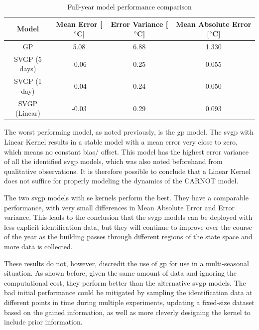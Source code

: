 \begin{table}[ht]
\centering
    \begin{tabular}{||c c c c||}
        \hline
        Model & Mean Error [$\degree$C] & Error Variance [$\degree$C] & Mean
        Absolute Error [$\degree$C]\\
        \hline \hline
        GP & 5.08 & 6.88 & 1.330 \\ 
        SVGP (5 days) & -0.06 & 0.25 & 0.055 \\ 
        SVGP (1 day) & -0.04 & 0.24 & 0.050 \\ 
        SVGP (Linear)& -0.03 & 0.29 & 0.093 \\ 
        \hline
    \end{tabular}
\caption{Full-year model performance comparison}
\label{tab:Model_comparations}
\end{table}

The worst performing model, as noted previously, is the \acrshort{gp} model. The
\acrshort{svgp} with Linear Kernel results in a stable model with a mean error
very close to zero, which means no constant bias/ offset. This model has the
highest error variance of all the identified \acrshort{svgp} models, which was
also noted beforehand from qualitative observations. It is therefore possible to
conclude that a Linear Kernel does not suffice for properly modeling the
dynamics of the CARNOT model.

The two \acrshort{svgp} models with \acrlong{se} kernels perform the best. They
have a comparable performance, with very small differences in Mean Absolute
Error and Error variance. This leads to the conclusion that the \acrshort{svgp}
models can be deployed with less explicit identification data, but they will
continue to improve over the course of the year as the building passes through
different regions of the state space and more data is collected.

These results do not, however, discredit the use of \acrlong{gp} for use in a
multi-seasonal situation. As shown before, given the same amount of data and
ignoring the computational cost, they perform better than the alternative
\acrshort{svgp} models. The bad initial performance could be mitigated by
sampling the identification data at different points in time during multiple
experiments, updating a fixed-size dataset based on the gained information, as
well as more cleverly designing the kernel to include prior information.


\clearpage
